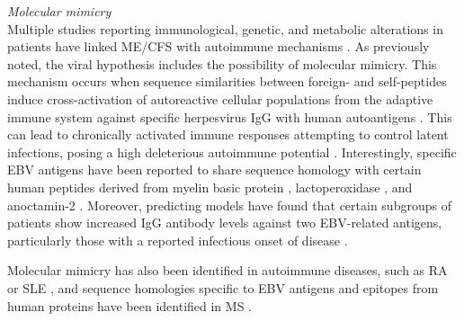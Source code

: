 \bsni
\textit{Molecular mimicry}\\
\noindent
Multiple studies reporting immunological, genetic, and metabolic alterations in patients have linked ME/CFS with autoimmune mechanisms \citep{sotznyMyalgicEncephalomyelitisChronic2018}.
As previously noted, the viral hypothesis includes the possibility of molecular mimicry.
This mechanism occurs when sequence similarities between foreign- and self-peptides induce cross-activation of autoreactive cellular populations from the adaptive immune system against specific herpesvirus IgG with human autoantigens \citep{fonseca2024IgGAntibody}.
This can lead to chronically activated immune responses attempting to control latent infections, posing a high deleterious autoimmune potential \citep{blomberg2018InfectionEliciteda, sepulveda2019MyalgicEncephalomyelitis, sundaresan2023RoleViral}.
Interestingly, specific EBV antigens have been reported to share sequence homology with certain human peptides derived from myelin basic protein \citep{lunemann2008EBNA1specificCells}, lactoperoxidase \citep{loebel2017SerologicalProfiling}, and anoctamin-2 \citep{tengvall2019MolecularMimicry, sepulveda2021ImpactGenetic}.
Moreover, predicting models have found that certain subgroups of patients show increased IgG antibody levels against two EBV-related antigens, particularly those with a reported infectious onset of disease \citep{sepulveda2022RevisitingIgG}.

Molecular mimicry has also been identified in autoimmune diseases, such as RA or SLE \citep{rojas2018MolecularMimicry}, and sequence homologies specific to EBV antigens and epitopes from human proteins have been identified in MS \citep{sospedra2005RecognitionConserved, gabibov2011CombinatorialAntibody}.


